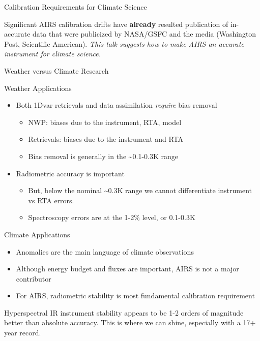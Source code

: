 \documentclass[10pt,t]{beamer}
\begin{document}
\begin{frame}[label={sec:org192bf2c},shrink=30]{Calibration Requirements for Climate Science}
\vspace{0.2in}
\begin{large}
Significant AIRS calibration drifts have \textbf{already} resulted publication of in-accurate data that were publicized by NASA/GSFC and the media (Washington Post, Scientific American).  \emph{This talk suggests how to make AIRS an accurate instrument for climate science.}
\end{large}
\end{frame}

\begin{frame}[label={sec:orgf059657},shrink=20]{Weather versus Climate Research}
\begin{block}{Weather Applications}
\begin{itemize}
\item Both 1Dvar retrievals and data assimilation \emph{require} bias removal
\begin{itemize}
\item NWP: biases due to the instrument, RTA, model
\item Retrievals: biases due to the instrument and RTA
\item Bias removal is generally in the \textasciitilde{}0.1-0.3K range
\end{itemize}
\item Radiometric accuracy is important
\begin{itemize}
\item But, below the nominal \textasciitilde{}0.3K range we cannot differentiate instrument vs RTA errors.
\item Spectroscopy errors are at the 1-2\% level, or 0.1-0.3K
\end{itemize}
\end{itemize}
\end{block}
\begin{block}{Climate Applications}
\begin{itemize}
\item Anomalies are the main language of climate observations
\item Although energy budget and fluxes are important, AIRS is not a major contributor
\item For AIRS, radiometric stability is most fundamental calibration requirement
\end{itemize}

Hyperspectral IR instrument stability appears to be 1-2 orders of magnitude better than absolute accuracy.  This is where we can shine, especially with a 17+ year record.
\end{block}
\end{frame}
\end{document}
